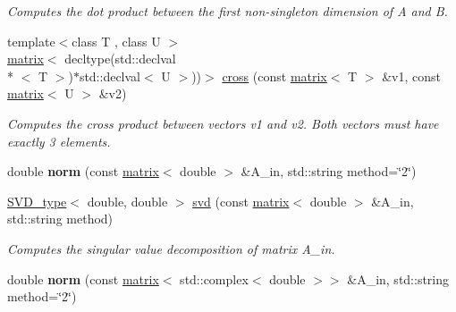 \begin{DoxyCompactItemize}
\begin{DoxyCompactList}\small\item\em Computes the dot product between the first non-\/singleton dimension of A and B. \end{DoxyCompactList}\item 
\hypertarget{namespacekeycpp_a157ec9804a57367b3153fb3cc81f9224}{{\footnotesize template$<$class T , class U $>$ }\\\hyperlink{classkeycpp_1_1matrix}{matrix}$<$ decltype(std\-::declval\\*
$<$ T $>$)$\ast$std\-::declval$<$ U $>$))$>$ \hyperlink{namespacekeycpp_a157ec9804a57367b3153fb3cc81f9224}{cross} (const \hyperlink{classkeycpp_1_1matrix}{matrix}$<$ T $>$ \&v1, const \hyperlink{classkeycpp_1_1matrix}{matrix}$<$ U $>$ \&v2)}\label{namespacekeycpp_a157ec9804a57367b3153fb3cc81f9224}

\begin{DoxyCompactList}\small\item\em Computes the cross product between vectors v1 and v2. Both vectors must have exactly 3 elements. \end{DoxyCompactList}\item 
\hypertarget{namespacekeycpp_aeb34bdd249af3ce92341cdda62f95f65}{double {\bfseries norm} (const \hyperlink{classkeycpp_1_1matrix}{matrix}$<$ double $>$ \&A\-\_\-in, std\-::string method=\char`\"{}2\char`\"{})}\label{namespacekeycpp_aeb34bdd249af3ce92341cdda62f95f65}

\item 
\hypertarget{namespacekeycpp_a838fc93d66e1ab63d68d04781086d81a}{\hyperlink{classkeycpp_1_1_s_v_d__type}{S\-V\-D\-\_\-type}$<$ double, double $>$ \hyperlink{namespacekeycpp_a838fc93d66e1ab63d68d04781086d81a}{svd} (const \hyperlink{classkeycpp_1_1matrix}{matrix}$<$ double $>$ \&A\-\_\-in, std\-::string method)}\label{namespacekeycpp_a838fc93d66e1ab63d68d04781086d81a}

\begin{DoxyCompactList}\small\item\em Computes the singular value decomposition of matrix A\-\_\-in. \end{DoxyCompactList}\item 
\hypertarget{namespacekeycpp_ad211ab5ae14ac9710265c662f70f20ff}{double {\bfseries norm} (const \hyperlink{classkeycpp_1_1matrix}{matrix}$<$ std\-::complex$<$ double $>$$>$ \&A\-\_\-in, std\-::string method=\char`\"{}2\char`\"{})}\label{namespacekeycpp_ad211ab5ae14ac9710265c662f70f20ff}


\end{DoxyCompactItemize}
